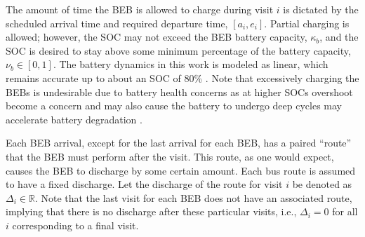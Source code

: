 \documentclass[ee,thesis]{usuthesis}
\begin{document}
The amount of time the BEB is allowed to charge during visit \(i\) is dictated by the scheduled arrival time and required
departure time, \([a_i, e_i]\). Partial charging is allowed; however, the SOC may not exceed the BEB battery capacity,
\(\kappa_b\), and the SOC is desired to stay above some minimum percentage of the battery capacity, \(\nu_b \in [0,1]\). The battery
dynamics in this work is modeled as linear, which remains accurate up to about an SOC of 80\%
\cite{liu-2020-batter-elect}. Note that excessively charging the BEBs is undesirable due to battery health concerns as
at higher SOCs overshoot become a concern and may also cause the battery to undergo deep cycles may accelerate battery
degradation \cite{edge-2021-lithium,millner-2010-model-lithium}.

Each BEB arrival, except for the last arrival for each BEB, has a paired ``route'' that the BEB must perform after the
visit. This route, as one would expect, causes the BEB to discharge by some certain amount. Each bus route is assumed to
have a fixed discharge. Let the discharge of the route for visit \(i\) be denoted as \(\Delta_i \in \mathbb{R}\). Note that the last visit
for each BEB does not have an associated route, implying that there is no discharge after these particular visits, i.e.,
\(\Delta_i = 0\) for all \(i\) corresponding to a final visit.
\end{document}
